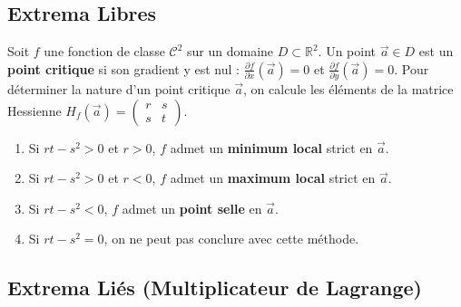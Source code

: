 \documentclass[french]{yLectureNote}
\renewcommand{\vec}{\overrightarrow}
\begin{document}
\subsection{Extrema Libres}
Soit $f$ une fonction de classe $\mathcal{C}^2$ sur un domaine $D \subset \mathbb{R}^2$.
Un point $\vec{a} \in D$ est un \textbf{point critique} si son gradient y est nul : $\frac{\partial f}{\partial x}(\vec{a}) = 0$ et $\frac{\partial f}{\partial y}(\vec{a}) = 0$.
Pour déterminer la nature d'un point critique $\vec{a}$, on calcule les éléments de la matrice Hessienne $H_f(\vec{a}) = \begin{pmatrix} r & s \\ s & t \end{pmatrix}$.
\begin{theorem}
\begin{enumerate}
    \item Si $rt - s^2 > 0$ et $r > 0$, $f$ admet un \textbf{minimum local} strict en $\vec{a}$.
    \item Si $rt - s^2 > 0$ et $r < 0$, $f$ admet un \textbf{maximum local} strict en $\vec{a}$.
    \item Si $rt - s^2 < 0$, $f$ admet un \textbf{point selle} en $\vec{a}$.
    \item Si $rt - s^2 = 0$, on ne peut pas conclure avec cette méthode.
\end{enumerate}
\end{theorem}

\subsection{Extrema Liés (Multiplicateur de Lagrange)}
\end{document}
